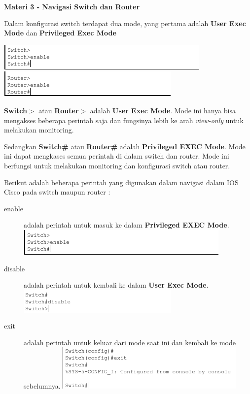 \documentclass{article}
\begin{document}
    \begin{flushleft}
        \textbf{Materi 3 - Navigasi Switch dan Router}
        \newline

        Dalam konfigurasi switch terdapat dua mode, yang pertama adalah \textbf{User Exec Mode} dan \textbf{Privileged Exec Mode}

        \includegraphics{switch-exec-mode.png}
        \includegraphics{router-exec-mode.png}

        \textbf{Switch$>$} atau \textbf{Router$>$} adalah \textbf{User Exec Mode}. Mode ini hanya bisa mengakses beberapa perintah saja dan fungsinya lebih ke arah \textit{view-only} untuk melakukan monitoring.
        \newline

        Sedangkan \textbf{Switch\#} atau \textbf{Router\#} adalah \textbf{Privileged EXEC Mode}. Mode ini dapat mengkases semua perintah di dalam switch dan router. Mode ini berfungsi untuk melakukan monitoring dan konfigurasi switch atau router.
        \newline

        Berikut adalah beberapa perintah yang digunakan dalam navigasi dalam IOS Cisco pada switch maupun router : 
        \begin{description}
            \item[enable] adalah perintah untuk masuk ke dalam \textbf{Privileged EXEC Mode}.
            \includegraphics{switch-exec-mode.png}

            \item[disable] adalah perintah untuk kembali ke dalam \textbf{User Exec Mode}.
            \includegraphics{disable-switch.png}

            \item[exit] adalah perintah untuk keluar dari mode saat ini dan kembali ke mode sebelumnya.
            \includegraphics{exit-switch.png}


\end{description}
\end{flushleft}
\end{document}
